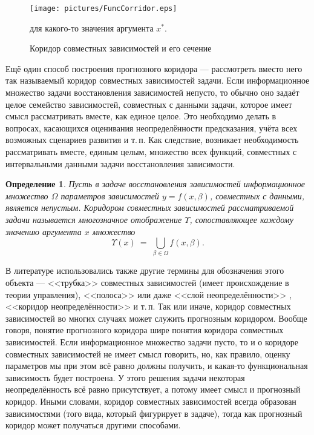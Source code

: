 \documentclass[a5paper,openany]{book}
\newtheorem{definition}{Определение}[section]
\begin{document}
   
\begin{figure}[htb] 
\centering\small  
    \texttt{[image: pictures/FuncCorridor.eps]} 
    \caption{Коридор совместных зависимостей и его сечение}
    для какого-то значения аргумента $x^\ast$. 
    \label{FuncTubePic} 
\end{figure} 
  
    
Ещё один способ построения прогнозного коридора --- рассмотреть вместо него так 
называемый коридор совместных зависимостей задачи. Если информационное множество задачи 
восстановления зависимостей непусто, то обычно оно задаёт целое семейство зависимостей, 
совместных с данными задачи, которое имеет смысл рассматривать вместе, как единое целое. 
Это необходимо делать в вопросах, касающихся оценивания неопределённости предсказания, 
учёта всех возможных сценариев развития и т.\,п. Как следствие, возникает необходимость 
рассматривать вместе, единым целым, множество всех функций, совместных с интервальными 
данными задачи восстановления зависимости. 
  
\begin{definition} 
Пусть в задаче восстановления зависимостей информационное множество $\varOmega$ 
параметров зависимостей $y = f(x,\beta)$, совместных с данными, является непустым. 
\textsl{Коридором совместных зависимостей} рассматриваемой задачи называется 
многозначное  отображение $\varUpsilon$, сопоставляющее каждому значению 
аргумента $x$ множество     
\begin{equation*} 
\varUpsilon(x) \  = \;\bigcup_{\beta\in\varOmega} f(x,\beta). 
\end{equation*} 
\end{definition} 
  
В литературе использовались также другие термины для обозначения этого объекта --- 
<<трубка>> совместных зависимостей \cite{Kumkov2010} (имеет происхождение в теории 
управления), <<полоса>> или даже <<слой неопределённости>> \cite{NovitskiZograf}, 
<<коридор неопределённости>> \cite{Skibitski} и т.\,п. Так или иначе, коридор 
совместных зависимостей во многих случаях может служить прогнозным коридором. 
Вообще говоря, понятие прогнозного коридора шире понятия коридора совместных 
зависимостей. Если информационное множество задачи пусто, то и о коридоре 
совместных зависимостей не имеет смысл говорить, но, как правило, оценку параметров 
мы при этом всё равно должны получить, и какая-то функциональная зависимость будет 
построена. У этого решения задачи некоторая неопределённость всё равно присутствует, 
а потому имеет смысл и прогнозный коридор. Иными словами, коридор совместных 
зависимостей всегда образован зависимостями (того вида, который фигурирует в задаче), 
тогда как прогнозный коридор может получаться другими способами.  
      
\end{document}
